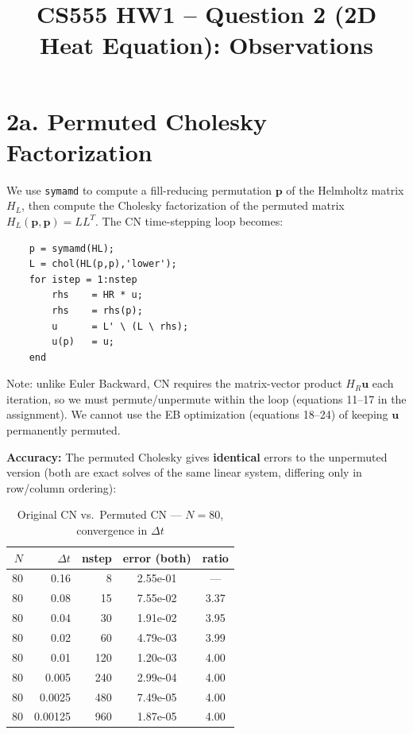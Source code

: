 \documentclass[11pt]{article}
\title{CS555 HW1 -- Question 2 (2D Heat Equation): Observations}
\author{}
\date{}
\begin{document}
\maketitle

\section*{2a. Permuted Cholesky Factorization}

We use \texttt{symamd} to compute a fill-reducing permutation $\mathbf{p}$
of the Helmholtz matrix $H_L$, then compute the Cholesky factorization of
the permuted matrix $H_L(\mathbf{p},\mathbf{p}) = LL^T$.
The CN time-stepping loop becomes:
\begin{verbatim}
    p = symamd(HL);
    L = chol(HL(p,p),'lower');
    for istep = 1:nstep
        rhs    = HR * u;
        rhs    = rhs(p);
        u      = L' \ (L \ rhs);
        u(p)   = u;
    end
\end{verbatim}

Note: unlike Euler Backward, CN requires the matrix-vector product $H_R \mathbf{u}$
each iteration, so we must permute/unpermute within the loop (equations 11--17 in
the assignment). We cannot use the EB optimization (equations 18--24) of keeping
$\mathbf{u}$ permanently permuted.

\medskip\noindent\textbf{Accuracy:} The permuted Cholesky gives \textbf{identical} errors
to the unpermuted version (both are exact solves of the same linear system,
differing only in row/column ordering):

\begin{table}[h!]
\centering
\caption{Original CN vs.\ Permuted CN --- $N=80$, convergence in $\Delta t$}
\begin{tabular}{rrrcc}
\toprule
$N$ & $\Delta t$ & nstep & error (both) & ratio \\
\midrule
80 & 0.16   &    8 & 2.55e-01 & --- \\
80 & 0.08   &   15 & 7.55e-02 & 3.37 \\
80 & 0.04   &   30 & 1.91e-02 & 3.95 \\
80 & 0.02   &   60 & 4.79e-03 & 3.99 \\
80 & 0.01   &  120 & 1.20e-03 & 4.00 \\
80 & 0.005  &  240 & 2.99e-04 & 4.00 \\
80 & 0.0025 &  480 & 7.49e-05 & 4.00 \\
80 & 0.00125&  960 & 1.87e-05 & 4.00 \\
\bottomrule
\end{tabular}
\end{table}
\end{document}
